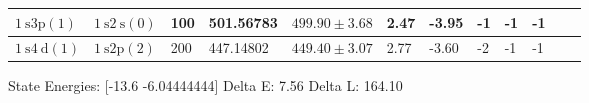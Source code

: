 \begin{adjustwidth}{-1cm}{-1cm}
\begin{adjustbox}{width=1.75\textwidth, center}
\begin{tabular}{|l|l|l|l|l|l|l|l|l|l|l|l|}
            \hline $1 \mathrm{~s} 3 \mathrm{p}(1)$  & $1 \mathrm{~s} 2 \mathrm{~s}(0)$ & 100                & 501.56783                                & $499.90 \pm 3.68$                & 2.47                         & -3.95                        & -1                 & -1                 & -1 \\
            \hline $1 \mathrm{~s} 4 \mathrm{~d}(1)$ & $1 \mathrm{~s} 2 \mathrm{p}(2)$  & 200                & 447.14802                                & $449.40 \pm 3.07$                & 2.77                         & -3.60                        & -2                 & -1                 & -1 \\
            \hline
        \end{tabular}

    \end{adjustbox}

\end{adjustwidth}



State Energies: [-13.6         -6.04444444]
Delta E: 7.56
Delta L: 164.10